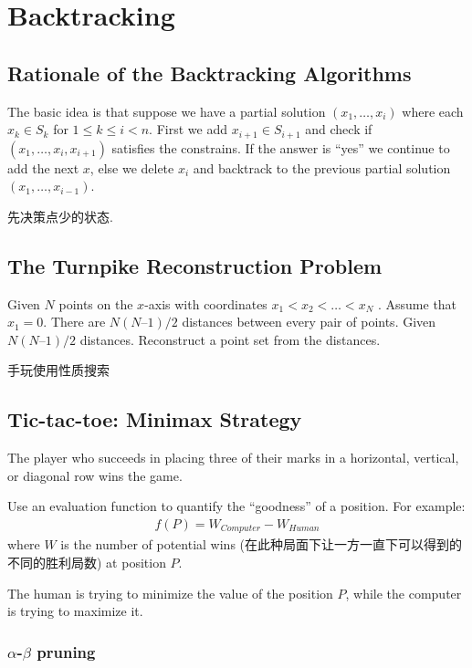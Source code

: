 \newpage
\section{Backtracking}
\subsection{Rationale of the Backtracking Algorithms}

The basic idea is that suppose we have a partial solution $( x_1, \dots , x_i )$ where each $x_k \in S_k$ for  $1 \le k \le i < n$.   First we add  $x_{i+1} \in S_{i+1}$ and check if $( x_1, \dots , x_i, x_{i+1} )$ satisfies the constrains.  If the answer is ``yes'' we continue to add the next $x$, else we delete $x_i$ and backtrack to the previous partial solution $( x_1, \dots , x_{i-1} )$.

先决策点少的状态. 

\subsection{The Turnpike Reconstruction Problem}
Given $N$ points on the $x$-axis with coordinates $x_1 <  x_2 < \dots < x_N$ .  Assume that $x_1 = 0$.  There are $N ( N – 1 ) / 2$ distances between every pair of points. Given $N ( N – 1 ) / 2$ distances.  Reconstruct a point set from the distances. 

手玩使用性质搜索


\subsection{Tic-tac-toe:  Minimax Strategy}
The player who succeeds in placing three of their marks in a horizontal, vertical, or diagonal row wins the game.



Use an evaluation function to quantify the ``goodness'' of a position.  For example:
\begin{align*}
    f(P)=W_{Computer}-W_{Human}
\end{align*}
where $W$ is the number of potential wins (在此种局面下让一方一直下可以得到的不同的胜利局数) at position $P$.

The human is trying to minimize the value of the position $P$, while the computer is trying to maximize it.

\subsubsection{\texorpdfstring{$\alpha$-$\beta$}. pruning}

